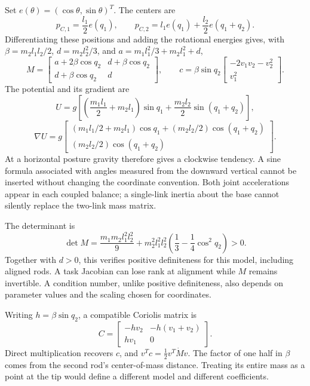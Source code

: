 Set $e(\theta)=(\cos\theta,\sin\theta)^T$. The centers are
\begin{equation}
p_{C,1}=\frac{l_1}{2}e(q_1),\qquad
p_{C,2}=l_1e(q_1)+\frac{l_2}{2}e(q_1+q_2).
\end{equation}
Differentiating these positions and adding the rotational energies gives, with $\beta=m_2l_1l_2/2$, $d=m_2l_2^2/3$, and $a=m_1l_1^2/3+m_2l_1^2+d$,
\begin{equation}
M=\begin{bmatrix}a+2\beta\cos q_2&d+\beta\cos q_2\\d+\beta\cos q_2&d\end{bmatrix},
\qquad
c=\beta\sin q_2\begin{bmatrix}-2v_1v_2-v_2^2\\v_1^2\end{bmatrix}.
\end{equation}
The potential and its gradient are
\begin{equation}
U=g\left[\left(\frac{m_1l_1}{2}+m_2l_1\right)\sin q_1+
\frac{m_2l_2}{2}\sin(q_1+q_2)\right],
\end{equation}
\begin{equation}
\nabla U=g\begin{bmatrix}
(m_1l_1/2+m_2l_1)\cos q_1+(m_2l_2/2)\cos(q_1+q_2)\\
(m_2l_2/2)\cos(q_1+q_2)
\end{bmatrix}.
\end{equation}
At a horizontal posture gravity therefore gives a clockwise tendency. A sine formula associated with angles measured from the downward vertical cannot be inserted without changing the coordinate convention. Both joint accelerations appear in each coupled balance; a single-link inertia about the base cannot silently replace the two-link mass matrix.

The determinant is
\begin{equation}
\det M=\frac{m_1m_2l_1^2l_2^2}{9}
 +m_2^2l_1^2l_2^2\left(\frac13-\frac14\cos^2q_2\right)>0.
\end{equation}
Together with $d>0$, this verifies positive definiteness for this model, including aligned rods. A task Jacobian can lose rank at alignment while $M$ remains invertible. A condition number, unlike positive definiteness, also depends on parameter values and the scaling chosen for coordinates.

Writing $h=\beta\sin q_2$, a compatible Coriolis matrix is
\begin{equation}
C=\begin{bmatrix}-hv_2&-h(v_1+v_2)\\hv_1&0\end{bmatrix}.
\end{equation}
Direct multiplication recovers $c$, and $v^Tc=\tfrac12v^T\dot Mv$. The factor of one half in $\beta$ comes from the second rod's center-of-mass distance. Treating its entire mass as a point at the tip would define a different model and different coefficients.

